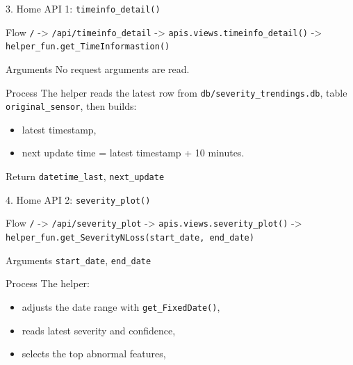 \documentclass[aspectratio=169]{beamer}
\begin{document}
\begin{frame}{3. Home API 1: \texttt{timeinfo\_detail()}}
\justifying
\begin{block}{Flow}
\texttt{/} -> \texttt{/api/timeinfo\_detail} ->
\texttt{apis.views.timeinfo\_detail()} ->
\texttt{helper\_fun.get\_TimeInformastion()}
\end{block}

\begin{block}{Arguments}
No request arguments are read.
\end{block}

\begin{block}{Process}
The helper reads the latest row from
\texttt{db/severity\_trendings.db}, table \texttt{original\_sensor},
then builds:
\begin{itemize}
    \item latest timestamp,
    \item next update time = latest timestamp + 10 minutes.
\end{itemize}
\end{block}

\begin{block}{Return}
\texttt{datetime\_last}, \texttt{next\_update}
\end{block}
\end{frame}

\begin{frame}{4. Home API 2: \texttt{severity\_plot()}}
\justifying
\begin{block}{Flow}
\texttt{/} -> \texttt{/api/severity\_plot} ->
\texttt{apis.views.severity\_plot()} ->
\texttt{helper\_fun.get\_SeverityNLoss(start\_date, end\_date)}
\end{block}

\begin{block}{Arguments}
\texttt{start\_date}, \texttt{end\_date}
\end{block}

\begin{block}{Process}
The helper:
\begin{itemize}
    \item adjusts the date range with \texttt{get\_FixedDate()},
    \item reads latest severity and confidence,
    \item selects the top abnormal features,
\end{itemize}
\end{block}

\end{frame}
\end{document}
